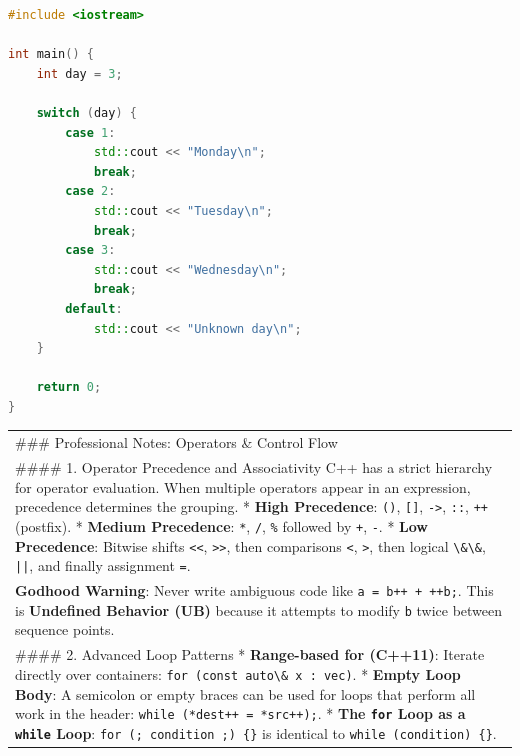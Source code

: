 \begin{lstlisting}[language={C++}]
#include <iostream>

int main() {
    int day = 3;

    switch (day) {
        case 1:
            std::cout << "Monday\n";
            break;
        case 2:
            std::cout << "Tuesday\n";
            break;
        case 3:
            std::cout << "Wednesday\n";
            break;
        default:
            std::cout << "Unknown day\n";
    }

    return 0;
}
\end{lstlisting}

\begin{longtable}[]{@{}
  >{\raggedright\arraybackslash}p{}@{}}
\toprule
\endhead
\#\#\# Professional Notes: Operators \& Control Flow \\
\#\#\#\# 1. Operator Precedence and Associativity C++ has a strict
hierarchy for operator evaluation. When multiple operators appear in an
expression, precedence determines the grouping. * \textbf{High
Precedence}: \passthrough{\lstinline!()!}, \passthrough{\lstinline![]!},
\passthrough{\lstinline!->!}, \passthrough{\lstinline!::!},
\passthrough{\lstinline!++!} (postfix). * \textbf{Medium Precedence}:
\passthrough{\lstinline!*!}, \passthrough{\lstinline!/!},
\passthrough{\lstinline!\%!} followed by \passthrough{\lstinline!+!},
\passthrough{\lstinline!-!}. * \textbf{Low Precedence}: Bitwise shifts
\passthrough{\lstinline!<<!}, \passthrough{\lstinline!>>!}, then
comparisons \passthrough{\lstinline!<!}, \passthrough{\lstinline!>!},
then logical \passthrough{\lstinline!\&\&!},
\passthrough{\lstinline!||!}, and finally assignment
\passthrough{\lstinline!=!}. \\
\textbf{Godhood Warning}: Never write ambiguous code like
\passthrough{\lstinline!a = b++ + ++b;!}. This is \textbf{Undefined
Behavior (UB)} because it attempts to modify \passthrough{\lstinline!b!}
twice between sequence points. \\
\#\#\#\# 2. Advanced Loop Patterns * \textbf{Range-based for (C++11)}:
Iterate directly over containers:
\passthrough{\lstinline!for (const auto\& x : vec)!}. * \textbf{Empty
Loop Body}: A semicolon or empty braces can be used for loops that
perform all work in the header:
\passthrough{\lstinline!while (*dest++ = *src++);!}. * \textbf{The
\passthrough{\lstinline!for!} Loop as a \passthrough{\lstinline!while!}
Loop}: \passthrough{\lstinline!for (; condition ;) \{\}!} is identical
to \passthrough{\lstinline!while (condition) \{\}!}. \\

\end{longtable}
